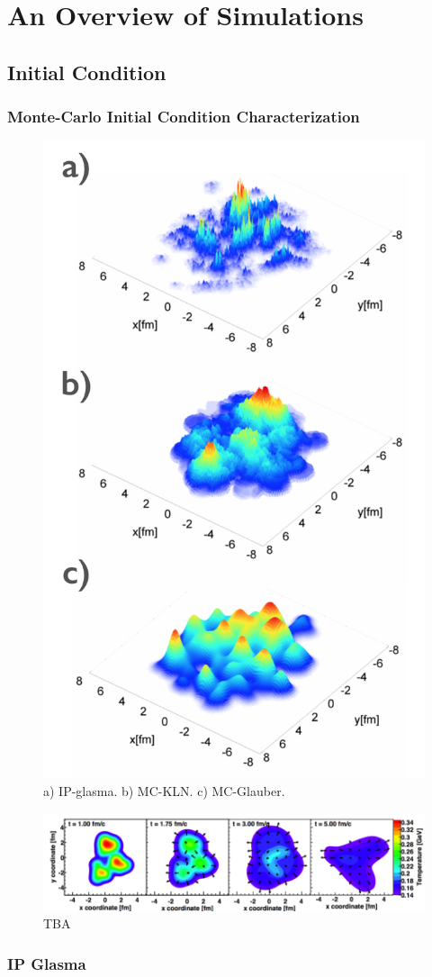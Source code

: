 \iffalse

\section{An Overview of Simulations}

\subsection{Initial Condition}
\subsubsection{Monte-Carlo Initial Condition Characterization}
\begin{figure}[h!]
\begin{center}
\includegraphics[width=0.45\linewidth]{figs/initial_conditions.png}
\caption{ a) IP-glasma. b) MC-KLN. c) MC-Glauber.}
\end{center}
\end{figure}

\begin{figure}[h!]
\begin{center}
\includegraphics[width=0.45\linewidth]{figs/he3au_simulation.png}
\caption{ TBA }
\end{center}
\end{figure}

\subsubsection{IP Glasma}

